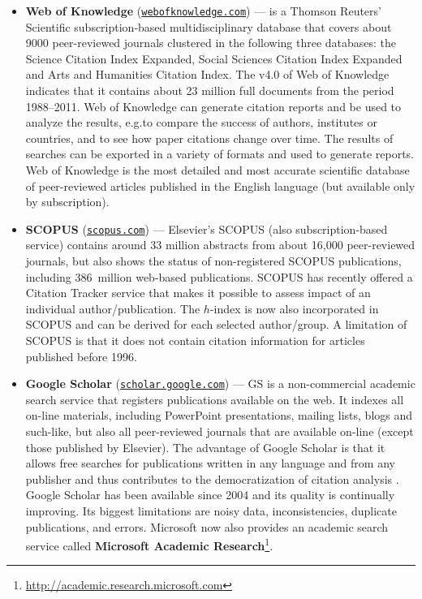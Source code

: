 \documentclass[graybox,envcountchap,sectrefs,UStrade]{svmono}
\begin{document}
\begin{itemize}
   \item \textbf{Web of Knowledge} (\href{http://webofknowledge.com}{\texttt{webofknowledge.com}}) --- is a Thomson Reuters' Scientific subscription-based multidisciplinary database that covers about 9000 peer-reviewed journals clustered in the following three databases: the Science Citation Index Expanded, Social Sciences Citation Index Expanded and Arts and Humanities Citation Index. The v4.0 of Web of Knowledge indicates that it contains about 23 million full documents from the period 1988--2011. Web of Knowledge can generate citation reports and be used to analyze the results, e.g.\@ to compare the success of authors, institutes or countries, and to see how paper citations change over time. The results of searches can be exported in a variety of formats and used to generate reports. Web of Knowledge is the most detailed and most accurate scientific database of peer-reviewed articles published in the English language (but available only by subscription).
  \item \textbf{SCOPUS} (\href{http://scopus.com}{\texttt{scopus.com}}) --- Elsevier's SCOPUS (also subscription-based service) contains around 33 million abstracts from about 16,000 peer-re\-view\-ed journals, but also shows the status of non-registered SCOPUS publications, including 386~million web-based publications. SCOPUS has recently offered a Citation Tracker service that makes it possible to assess impact of an individual author/publication. The $h$-index is now also incorporated in SCOPUS and can be derived for each selected author/group. A limitation of SCOPUS is that it does not contain citation information for articles published before 1996.
  \item \textbf{Google Scholar} (\href{http://scholar.google.com}{\texttt{scholar.google.com}}) --- GS is a non-comme\-rcial academic search service that registers publications available on the web. It indexes all on-line materials, including PowerPoint presentations, mailing lists, blogs and such-like, but also all peer-reviewed journals that are available on-line (except those published by Elsevier). The advantage of Google Scholar is that it allows free searches for publications written in any language and from any publisher and thus contributes to the democratization of citation analysis \citep{Harzing2008ESEP,Harzing2010}. Google Scholar has been available since 2004 and its quality is continually improving. Its biggest limitations are noisy data, inconsistencies, duplicate publications, and errors. Microsoft now also provides an academic search service called \textbf{Microsoft Academic Research}\footnote{\url{http://academic.research.microsoft.com}}.
\end{itemize}
\end{document}
